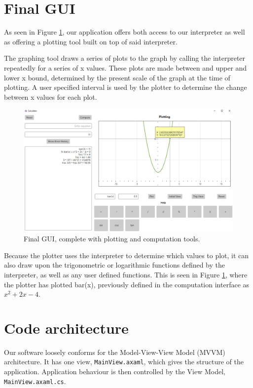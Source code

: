 \documentclass[a4paper, oneside, 11pt]{report}
\begin{document}
    \section{Final GUI}

    As seen in Figure \ref{gui08}, our application offers both access to our interpreter as well as offering a plotting tool built on top of said interpreter.

    The graphing tool draws a series of plots to the graph by calling the interpreter repeatedly for a series of x values. These plots are made between and upper and lower x bound, determined by the present scale of the graph at the time of plotting. A user specified interval is used by the plotter to determine the change between x values for each plot.

    \begin{figure}[htb]
        \includegraphics[width=0.9 \columnwidth]{advProgScreencap.png}
        \caption{Final GUI, complete with plotting and computation tools.}
        \label{gui08}
    \end{figure}

    Because the plotter uses the interpreter to determine which values to plot, it can also draw upon the trigonometric or logarithmic functions defined by the interpreter, as well as any user defined functions. This is seen in Figure \ref{gui08}, where the plotter has plotted bar(x), previously defined in the computation interface as \( x^2 + 2x - 4 \).


    \section{Code architecture}
    \paragraph{}
    Our software loosely conforms for the Model-View-View Model (MVVM) architecture. It has one view, \verb|MainView.axaml|, which gives the structure of the application. Application behaviour is then controlled by the View Model, \verb|MainView.axaml.cs|.
\end{document}

